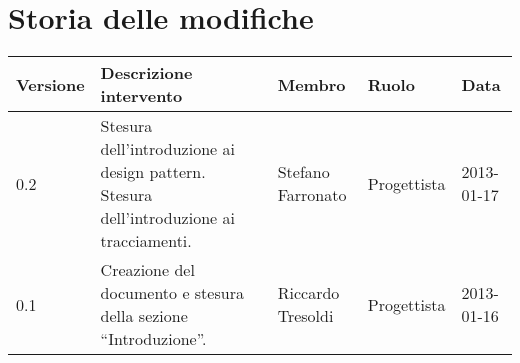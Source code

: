 \newcommand{\docName}{Specifica tecnica}
\newcommand{\docFileName}{specifica\_tecnica.1.0.pdf}
\newcommand{\docVers}{0.1}
\newcommand{\creationDate}{2013-01-16}
\newcommand{\modificationDate}{2013-01-17}
\newcommand{\docState}{Non approvato}
\newcommand{\docUsage}{Interno}
\newcommand{\docDistributionList}{Team SoftwareSynthesis}
\newcommand{\docAuthors}{}
\newcommand{\approvedBy}{}
\newcommand{\verifiedBy}{}
\newcommand{\docRoot}{..}
\def\INDICETABELLE{false}
\def\INDICEFIGURE{false}









\section*{Storia delle modifiche}
\begin{center}
\begin{longtable}{lp{}lll}
\toprule
Versione & Descrizione intervento & Membro & Ruolo & Data\\
\midrule %
0.2 & Stesura dell'introduzione ai design pattern. Stesura dell'introduzione ai tracciamenti. & Stefano Farronato & Progettista & 2013-01-17\\
0.1 & Creazione del documento e stesura della sezione ``Introduzione''. & Riccardo Tresoldi & Progettista & 2013-01-16\\
\bottomrule
\end{longtable}
\end{center}
\newpage

